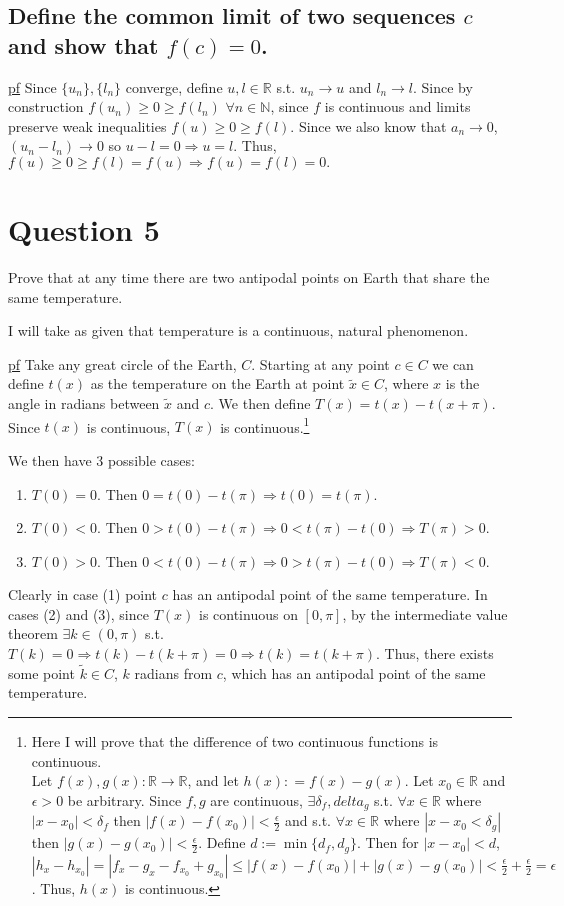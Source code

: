 \documentclass[11pt]{article} %
\begin{document}
	\subsection{Define the common limit of two sequences $c$ and show that $f(c) = 0$.}
	\underline{pf} Since $\{ u_n\}, \{ l_n\}$ converge, define $u,l \in \mathbb{R}$ s.t. $u_n \rightarrow u$ and $l_n \rightarrow l$. Since by construction $f(u_n) \geq 0 \geq f(l_n)$ $\forall n \in \mathbb{N}$, since $f$ is continuous and limits preserve weak inequalities $f(u) \geq 0 \geq f(l)$. Since we also know that $a_n \rightarrow 0$, $(u_n - l_n) \rightarrow 0$ so $u - l = 0 \Rightarrow u = l$. Thus, $f(u) \geq 0 \geq f(l) = f(u) \Rightarrow f(u) = f(l) = 0.$
	
	\section{Question 5}
	Prove that at any time there are two antipodal points on Earth that share the same temperature.
	
	I will take as given that temperature is a continuous, natural phenomenon.
	
	\underline{pf} Take any great circle of the Earth, $C$. Starting at any point $c \in C$ we can define $t(x)$ as the temperature on the Earth at point $\tilde{x} \in C$, where $x$ is the angle in radians between $\tilde{x}$ and $c$. We then define $T(x) = t(x) - t(x+\pi).$ Since $t(x)$ is continuous, $T(x)$ is continuous.\footnote{Here I will prove that the difference of two continuous functions is continuous. \\ Let $f(x),g(x): \mathbb{R} \rightarrow \mathbb{R}$, and let $h(x): = f(x) - g(x)$. Let $x_{0} \in \mathbb{R}$ and $\epsilon > 0$ be arbitrary. Since $f,g$ are continuous, $\exists \delta_f, delta_g$ s.t. $\forall x \in \mathbb{R}$ where $|x-x_0|<\delta_f$ then $|f(x)-f(x_0)|<\frac{\epsilon}{2}$ and s.t. $\forall x \in \mathbb{R}$ where $|x-x_0<\delta_g|$ then $|g(x)-g(x_0)|<\frac{\epsilon}{2}$. Define $d:= \min \{ d_f,d_g\}$. Then for $|x - x_0| < d$, $|h_x - h_{x_0}| = |f_x - g_x  - f_{x_0} + g_{x_0}| \leq |f(x) - f(x_0)|+|g(x) - g(x_0)| < \frac{\epsilon}{2} + \frac{\epsilon}{2} = \epsilon$. Thus, $h(x)$ is continuous.}
	
	We then have 3 possible cases:
	\begin{enumerate}
		\item
		$T(0) = 0$. Then $0 = t(0)-t(\pi) \Rightarrow t(0) = t(\pi)$.
		\item
		$T(0) < 0$. Then $0> t(0) - t(\pi) \Rightarrow 0 < t(\pi) - t(0) \Rightarrow T(\pi) >0$.
		\item
		$T(0) > 0$. Then $0<t(0) - t(\pi) \Rightarrow 0> t(\pi) - t(0) \Rightarrow T(\pi) <0$.
	\end{enumerate}
	Clearly in case (1) point $c$ has an antipodal point of the same temperature. In cases (2) and (3), since $T(x)$ is continuous on $[0,\pi]$, by the intermediate value theorem $\exists k \in (0,\pi)$ s.t. $T(k) = 0 \Rightarrow t(k) - t(k+\pi) = 0 \Rightarrow t(k) = t(k+\pi)$. Thus, there exists some point $\tilde{k} \in C$, $k$ radians from $c$, which has an antipodal point of the same temperature.
\end{document}

